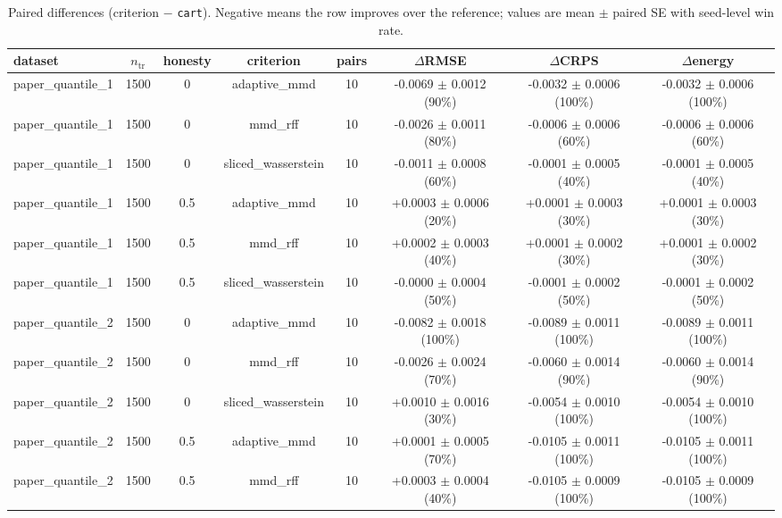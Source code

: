 \begin{table}[h]
  \centering
  \caption{Paired differences (criterion $-$ \texttt{cart}). Negative means the row improves over the reference; values are mean $\pm$ paired SE with seed-level win rate.}
  \label{tab:synthetic}
  \begin{adjustbox}{max width=\textwidth}
  \begin{tabular}{lccccccc}
    \toprule
    dataset & $n_{\mathrm{tr}}$ & honesty & criterion & pairs & $\Delta$RMSE & $\Delta$CRPS & $\Delta$energy \\
    \midrule
    paper\_quantile\_1 & 1500 & 0 & adaptive\_mmd & 10 & -0.0069 $\pm$ 0.0012 (90\%) & -0.0032 $\pm$ 0.0006 (100\%) & -0.0032 $\pm$ 0.0006 (100\%) \\
    paper\_quantile\_1 & 1500 & 0 & mmd\_rff & 10 & -0.0026 $\pm$ 0.0011 (80\%) & -0.0006 $\pm$ 0.0006 (60\%) & -0.0006 $\pm$ 0.0006 (60\%) \\
    paper\_quantile\_1 & 1500 & 0 & sliced\_wasserstein & 10 & -0.0011 $\pm$ 0.0008 (60\%) & -0.0001 $\pm$ 0.0005 (40\%) & -0.0001 $\pm$ 0.0005 (40\%) \\
    paper\_quantile\_1 & 1500 & 0.5 & adaptive\_mmd & 10 & +0.0003 $\pm$ 0.0006 (20\%) & +0.0001 $\pm$ 0.0003 (30\%) & +0.0001 $\pm$ 0.0003 (30\%) \\
    paper\_quantile\_1 & 1500 & 0.5 & mmd\_rff & 10 & +0.0002 $\pm$ 0.0003 (40\%) & +0.0001 $\pm$ 0.0002 (30\%) & +0.0001 $\pm$ 0.0002 (30\%) \\
    paper\_quantile\_1 & 1500 & 0.5 & sliced\_wasserstein & 10 & -0.0000 $\pm$ 0.0004 (50\%) & -0.0001 $\pm$ 0.0002 (50\%) & -0.0001 $\pm$ 0.0002 (50\%) \\
    paper\_quantile\_2 & 1500 & 0 & adaptive\_mmd & 10 & -0.0082 $\pm$ 0.0018 (100\%) & -0.0089 $\pm$ 0.0011 (100\%) & -0.0089 $\pm$ 0.0011 (100\%) \\
    paper\_quantile\_2 & 1500 & 0 & mmd\_rff & 10 & -0.0026 $\pm$ 0.0024 (70\%) & -0.0060 $\pm$ 0.0014 (90\%) & -0.0060 $\pm$ 0.0014 (90\%) \\
    paper\_quantile\_2 & 1500 & 0 & sliced\_wasserstein & 10 & +0.0010 $\pm$ 0.0016 (30\%) & -0.0054 $\pm$ 0.0010 (100\%) & -0.0054 $\pm$ 0.0010 (100\%) \\
    paper\_quantile\_2 & 1500 & 0.5 & adaptive\_mmd & 10 & +0.0001 $\pm$ 0.0005 (70\%) & -0.0105 $\pm$ 0.0011 (100\%) & -0.0105 $\pm$ 0.0011 (100\%) \\
    paper\_quantile\_2 & 1500 & 0.5 & mmd\_rff & 10 & +0.0003 $\pm$ 0.0004 (40\%) & -0.0105 $\pm$ 0.0009 (100\%) & -0.0105 $\pm$ 0.0009 (100\%) \\

\end{tabular}
\end{adjustbox}
\end{table}
